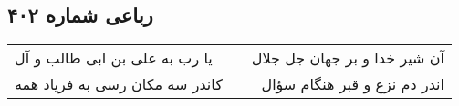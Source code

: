 \begin{center}
\section*{رباعی شماره ۴۰۲}
\label{sec:sh402}
\begin{longtable}{l p{0.5cm} r}
یا رب به علی بن ابی طالب و آل
&&
آن شیر خدا و بر جهان جل جلال
\\
کاندر سه مکان رسی به فریاد همه
&&
اندر دم نزع و قبر هنگام سؤال
\\
\end{longtable}
\end{center}
